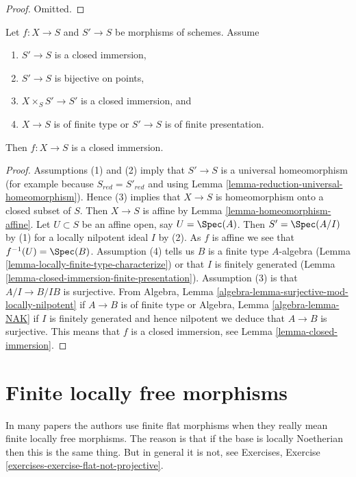 \begin{proof}
Omitted.
\end{proof}

\begin{lemma}
\label{lemma-check-closed-infinitesimally}
Let $f : X \to S$ and $S' \to S$ be morphisms of schemes.
Assume
\begin{enumerate}
\item $S' \to S$ is a closed immersion,
\item $S' \to S$ is bijective on points,
\item $X \times_S S' \to S'$ is a closed immersion, and
\item $X \to S$ is of finite type or $S' \to S$ is of finite presentation.
\end{enumerate}
Then $f : X \to S$ is a closed immersion.
\end{lemma}

\begin{proof}
Assumptions (1) and (2) imply that $S' \to S$ is a universal homeomorphism
(for example because $S_{red} = S'_{red}$ and using
Lemma \ref{lemma-reduction-universal-homeomorphism}).
Hence (3) implies that $X \to S$ is homeomorphism onto a
closed subset of $S$. Then $X \to S$ is affine by
Lemma \ref{lemma-homeomorphism-affine}.
Let $U \subset S$ be an affine open, say $U = \Spec(A)$. Then $S' = \Spec(A/I)$
by (1) for a locally nilpotent ideal $I$ by (2). As $f$ is affine we see that
$f^{-1}(U) = \Spec(B)$.
Assumption (4) tells us $B$ is a finite type $A$-algebra
(Lemma \ref{lemma-locally-finite-type-characterize}) or
that $I$ is finitely generated
(Lemma \ref{lemma-closed-immersion-finite-presentation}).
Assumption (3) is that $A/I \to B/IB$ is surjective. From
Algebra, Lemma \ref{algebra-lemma-surjective-mod-locally-nilpotent}
if $A \to B$ is of finite type
or Algebra, Lemma \ref{algebra-lemma-NAK} if $I$ is finitely generated
and hence nilpotent we deduce that $A \to B$ is surjective.
This means that $f$ is a closed immersion, see
Lemma \ref{lemma-closed-immersion}.
\end{proof}




\section{Finite locally free morphisms}
\label{section-finite-locally-free}

\noindent
In many papers the authors use finite flat morphisms when they really mean
finite locally free morphisms. The reason is that if the base is locally
Noetherian then this is the same thing. But in general it is not, see
Exercises, Exercise \ref{exercises-exercise-flat-not-projective}.

